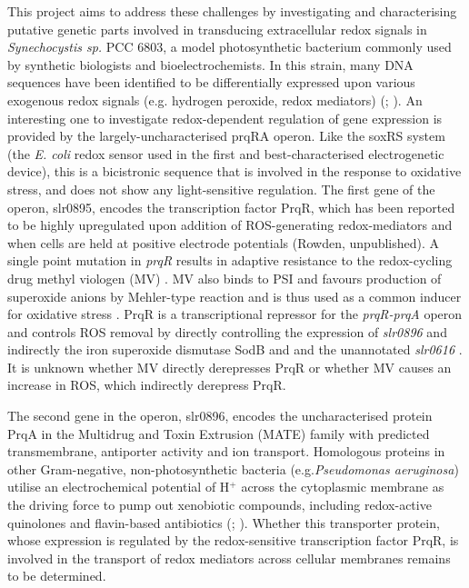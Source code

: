 This project aims to address these challenges by investigating and characterising putative genetic parts involved in transducing extracellular redox signals in \textit{Synechocystis sp.} PCC 6803, a model photosynthetic bacterium commonly used by synthetic biologists and bioelectrochemists.
In this strain, many DNA sequences have been identified to be differentially expressed upon various exogenous redox signals (e.g. hydrogen peroxide, redox mediators) (\citealt{Hihara2003}; \citealt{RoblesRengel2019}).
An interesting one to investigate redox-dependent regulation of gene expression is provided by the largely-uncharacterised prqRA operon. Like the soxRS system (the \textit{E. coli} redox sensor used in the first and best-characterised electrogenetic device), this is a bicistronic sequence that is involved in the response to oxidative stress, and does not show any light-sensitive regulation. 
The first gene of the operon, slr0895, encodes the transcription factor PrqR, which has been reported to be highly upregulated upon addition of ROS-generating redox-mediators\citep{Khan2016} and when cells are held at positive electrode potentials (Rowden, unpublished).  A single point mutation in \textit{prqR} results in adaptive resistance to the redox-cycling drug methyl viologen (MV) \citep{Kirik2003}. MV also binds to PSI and favours production of superoxide anions by Mehler-type reaction and is thus used as a common inducer for oxidative stress \citep{Chua1971}. PrqR is a transcriptional repressor for the \textit{prqR-prqA} operon and controls ROS removal by directly controlling  the expression of \textit{slr0896} and indirectly the iron superoxide dismutase SodB and and the unannotated \textit{slr0616} \citep{Khan2016}. It is unknown whether MV directly derepresses PrqR or whether MV causes an increase in ROS, which indirectly derepress  PrqR.  

The second gene in the operon, slr0896,  encodes the uncharacterised protein PrqA in the Multidrug and Toxin Extrusion (MATE) family with predicted transmembrane, antiporter activity and ion transport. Homologous proteins in other Gram-negative, non-photosynthetic bacteria (e.g.\textit{Pseudomonas aeruginosa}) utilise an electrochemical potential of H$^+$ across the cytoplasmic membrane as the driving force to pump out xenobiotic compounds, including redox-active quinolones and flavin-based antibiotics (\citealt{Morita1998}; \citealt{Masuda2000}). Whether this transporter protein, whose expression is regulated by the redox-sensitive transcription factor PrqR, is involved in the transport of redox mediators across cellular membranes remains to be determined. 


